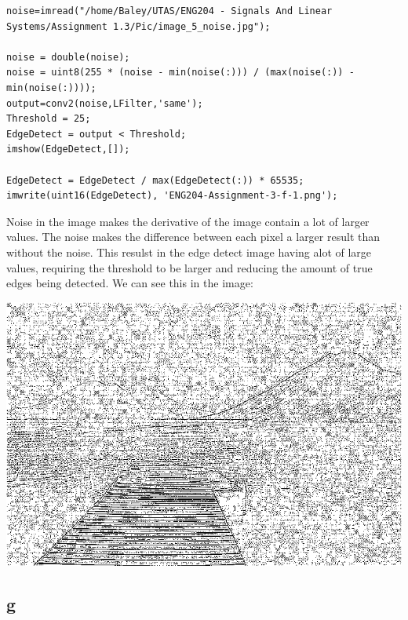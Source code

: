 \documentclass[11pt]{article}
\begin{document}
\begin{verbatim}
noise=imread("/home/Baley/UTAS/ENG204 - Signals And Linear Systems/Assignment 1.3/Pic/image_5_noise.jpg");

noise = double(noise);
noise = uint8(255 * (noise - min(noise(:))) / (max(noise(:)) - min(noise(:))));
output=conv2(noise,LFilter,'same');
Threshold = 25;
EdgeDetect = output < Threshold;
imshow(EdgeDetect,[]);

EdgeDetect = EdgeDetect / max(EdgeDetect(:)) * 65535;
imwrite(uint16(EdgeDetect), 'ENG204-Assignment-3-f-1.png');
\end{verbatim}
Noise in the image makes the derivative of the image contain a lot of larger values. The noise makes the difference between each pixel a larger result than without the noise. This resulst in the edge detect image having alot of large values, requiring the threshold to be larger and reducing the amount of true edges being detected. We can see this in the image:
\begin{center}
\includegraphics[width=.9\linewidth]{ENG204-Assignment-3-f-1.png}
\end{center}
\subsection{g}
\label{sec:org15b59ef}
\end{document}
